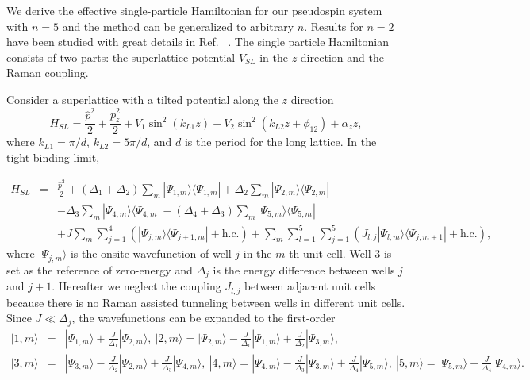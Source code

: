 \documentclass[twocolumn,prl,floatfix,citeautoscript,nofootinbib]{revtex4}
\begin{document}
We derive the effective single-particle Hamiltonian for our pseudospin
system with $n=5$ and the method can be generalized to arbitrary $n$.
Results for $n=2$ have been studied with great details in Ref.~\cite{Li2016}%
. The single particle Hamiltonian consists of two parts: the superlattice
potential $V_{SL}$ in the $z$-direction and the Raman coupling.

Consider a superlattice with a tilted potential along the $z$ direction
\begin{equation}
H_{SL}=\frac{\hat{p}^{2}}{2}+\frac{p_{z}^{2}}{2}+V_{1}\sin
^{2}(k_{L1}z)+V_{2}\sin ^{2}(k_{L2}z+\phi _{12})+\alpha _{z}z,
\end{equation}%
where $k_{L1}=\pi /d$, $k_{L2}=5\pi /d$, and $d$ is the period for the long
lattice. In the tight-binding limit,

\begin{eqnarray*}
H_{SL} &=&\frac{\hat{p}^{2}}{2}+\left( \Delta _{1}+\Delta _{2}\right)
\sum_{m} |\Psi _{1,m}\rangle \langle \Psi _{1,m}| +\Delta _{2}\sum_{m}|\Psi
_{2,m}\rangle \langle \Psi _{2,m}| \\
&&-\Delta _{3}\sum_{m}|\Psi _{4,m}\rangle \langle \Psi _{4,m}|-\left( \Delta
_{4}+\Delta _{3}\right) \sum_{m}|\Psi _{5,m}\rangle \langle \Psi _{5,m}| \\
&&+J\sum_{m}\sum_{j=1}^{4}\left( |\Psi _{j,m}\rangle \langle \Psi _{j+1,m}|+
\mathrm{{h.c.} }\right) +\sum_{m}\sum_{l=1}^{5}\sum_{j=1}^{5}\left(
J_{l,j}|\Psi _{l,m}\rangle \langle \Psi _{j,m+1}|+ \mathrm{h.c.}\right) ,
\end{eqnarray*}%
where $|\Psi _{j,m}\rangle $ is the onsite wavefunction of well $j$ in the $%
m $-th unit cell. Well $3$ is set as the reference of zero-energy and $%
\Delta _{j}$ is the energy difference between wells $j$ and $j+1$. Hereafter
we neglect the coupling $J_{l,j}$ between adjacent unit cells because there
is no Raman assisted tunneling between wells in different unit cells. Since $%
J\ll \Delta _{j}$, the wavefunctions can be expanded to the first-order
\begin{eqnarray}
|1,m\rangle &=&|\Psi _{1,m}\rangle +\frac{J}{\Delta _{1}}|\Psi _{2,m}\rangle
,~|2,m\rangle =|\Psi _{2,m}\rangle -\frac{J}{\Delta _{1}}|\Psi _{1,m}\rangle
+\frac{J}{\Delta _{2}}|\Psi _{3,m}\rangle , \\
|3,m\rangle &=&|\Psi _{3,m}\rangle -\frac{J}{\Delta _{2}}|\Psi _{2,m}\rangle
+\frac{J}{\Delta _{3}}|\Psi _{4,m}\rangle ,~|4,m\rangle =|\Psi _{4,m}\rangle
-\frac{J}{\Delta _{3}}|\Psi _{3,m}\rangle +\frac{J}{\Delta _{4}}|\Psi
_{5,m}\rangle ,~|5,m\rangle =|\Psi _{5,m}\rangle -\frac{J}{\Delta _{4}}|\Psi
_{4,m}\rangle .  \nonumber
\end{eqnarray}
\end{document}
